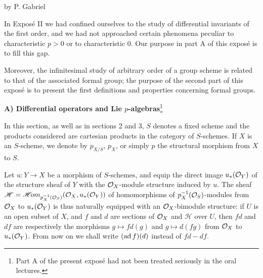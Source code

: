 \label{VIIA}
\begin{center}by P. Gabriel\end{center}

In Expos\'e II we had confined ourselves to the study of differential invariants of the first order, and we had not approached certain phenomena peculiar to characteristic $p>0$ or to characteristic $0$. Our purpose in part A of this expos\'e is to fill this gap.

Moreover, the infinitesimal study of arbitrary order of a group scheme is related to that of the associated formal group; the purpose of the second part of this expos\'e is to present the first definitions and properties concerning formal groups.

\begin{center}\textbf{A) Differential operators and Lie $p$-algebras}{\renewcommand{\thefootnote}{*}\footnote{Part A of the present expos\'e had not been treated seriously in the oral lectures.}}\end{center}
\setcounter{footnote}{0}

In this section, as well as in sections 2 and 3, $S$ denotes a fixed scheme and the products considered are cartesian products in the category of $S$-schemes. If $X$ is an $S$-scheme, we denote by $p_{X/S}$, $p_X$, or simply $p$ the structural morphism from $X$ to $S$.

Let $u:Y\to X$ be a morphism of $S$-schemes, and equip the direct image $u_*(\mathcal{O}_Y)$ of the structure sheaf of $Y$ with the $\mathcal{O}_X$-module structure induced by $u$. The sheaf $\mathscr H=\mathscr{H}\!om_{p_X^{-1}(\mathcal{O}_S)}(\mathcal{O}_X,u_*(\mathcal{O}_Y))$ of homomorphisms of $p_X^{-1}(\mathcal{O}_S)$-modules from $\mathcal{O}_X$ to $u_*(\mathcal{O}_Y)$ is thus naturally equipped with an $\mathcal{O}_X$-bimodule structure: if $U$ is an open subset of $X$, and $f$ and $d$ are sections of $\mathcal{O}_X$ and $\mathscr H$ over $U$, then $fd$ and $df$ are respectively the morphisms $g\mapsto fd(g)$ and $g\mapsto d(fg)$ from $\mathcal{O}_X$ to $u_*(\mathcal{O}_Y)$. From now on we shall write $(\operatorname{ad} f)(d)$ instead of $fd-df$.

